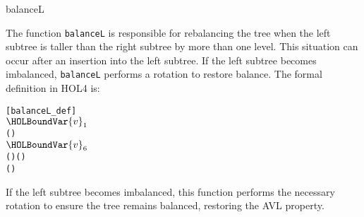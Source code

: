 \begin{defn}{balanceL}

The function \texttt{balanceL} is responsible for rebalancing the tree when the left subtree is taller than the right subtree by more than one level. This situation can occur after an insertion into the left subtree. If the left subtree becomes imbalanced, \texttt{balanceL} performs a rotation to restore balance. The formal definition in HOL4 is:

\begin{alltt}
	[balanceL_def]
	     \HOLTokenDefEquality{}
     \HOLSymConst{=}   \HOLSymConst{\ensuremath{+}}  
      
       \HOLTokenImp{}     
    \HOLTokenBar{}  \ensuremath{\HOLBoundVar{v}\sb{\mathrm{1}}}     \HOLTokenImp{}
         \HOLSymConst{\HOLTokenLt{}}   
          
           \HOLTokenImp{}     (    )
        \HOLTokenBar{}  \ensuremath{\HOLBoundVar{v}\sb{\mathrm{6}}}     \HOLTokenImp{}
             (    ) (    )
           (    )
       
\end{alltt}


If the left subtree becomes imbalanced, this function performs the necessary rotation to ensure the tree remains balanced, restoring the AVL property.
\end{defn}

